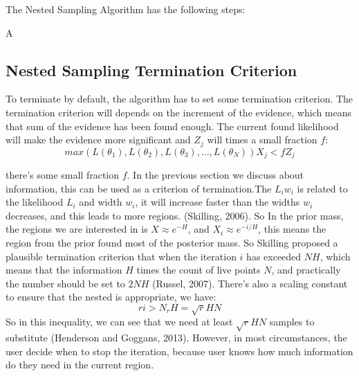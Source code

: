 \documentclass[11pt]{book}
\begin{document}
The Nested Sampling Algorithm has the following steps:
\begin{algorithm}
	\caption{A}
	\label{alg:A}
	\begin{algorithmic}
	\REPEAT 
	\end{algorithmic}
	\end{algorithm}
\subsection{Nested Sampling Termination Criterion}
To terminate by default, the algorithm has to set some termination criterion.
The termination criterion will depends on the increment of the evidence, which means that 
sum of the evidence has been found enough.
The current found likelihood will make the evidence more significant and $Z_j$ will times a small fraction $f$:
\begin{equation}
	max(L(\theta _1),L(\theta _2),L(\theta _3),...,L(\theta _N))X_j< fZ_j
\end{equation} 

there's some small fraction $f$.
In the previous section we discuss about information, this can be used as a criterion of termination.The $L_iw_i$ is related to the likelihood $L_i$ and width $w_i$, it will increase faster than 
 the widths $w_i$ decreases, and this leads to more regions. (Skilling, 2006). So In the prior mass, the regions we are interested in is $X \approx e^{-H}$, and $X_i \approx e^{-i/H}$, this means 
 the region from the prior found most of the posterior mass. So Skilling proposed a plausible termination criterion 
 that when the iteration $i$ has exceeded $NH$, which means that the information $H$ times the count of 
 live points $N$,
 and practically the number should be set to $2NH$ (Russel, 2007). There's also a scaling constant to ensure that the 
 nested is appropriate, we have:
 \begin{equation}
  ri > N_rH = \sqrt{r}HN
 \end{equation}
 So in this inequality, we can see that we need at least $\sqrt{r}HN$ samples to substitute (Henderson and Goggans, 2013).  
 However, in most circumstances, the user decide when to stop the iteration, because user knows how much information 
 do they need in the current region.
\end{document}
